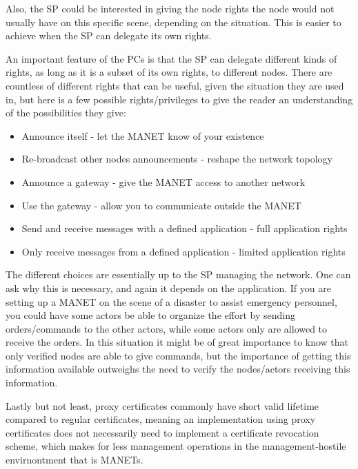 Also, the \ac{SP} could be interested in giving the node rights the node would
not usually have on this specific scene, depending on the situation. This is
easier to achieve when the \ac{SP} can delegate its own rights.

An important feature of the \acp{PC} is that the \ac{SP} can delegate different
kinds of rights, as long as it is a subset of its own rights, to different
nodes. There are countless of different rights that can be useful, given the situation
they are used in, but here is a few possible rights/privileges to give the
reader an understanding of the possibilities they give:

\begin{itemize}
  \item Announce itself - let the \ac{MANET} know of your existence
  \item Re-broadcast other nodes announcements - reshape the network topology
  \item Announce a gateway - give the \ac{MANET} access to another network
  \item Use the gateway - allow you to communicate outside the \ac{MANET}
  \item Send and receive messages with a defined application - full application
  rights
  \item Only receive messages from a defined application - limited application
  rights
\end{itemize}

The different choices are essentially up to the \ac{SP} managing the network.
One can ask why this is necessary, and again it depends on the application. If
you are setting up a \ac{MANET} on the scene of a disaster to assist emergency
personnel, you could have some actors be able to organize the effort by sending
orders/commands to the other actors, while some actors only are allowed to
receive the orders. In this situation it might be of great importance to know
that only verified nodes are able to give commands, but the importance of
getting this information available outweighs the need to verify the nodes/actors
receiving this information.

Lastly but not least, proxy certificates commonly have short valid lifetime
compared to regular certificates, meaning an implementation using proxy
certificates does not necessarily need to implement a certificate revocation
scheme, which makes for less management operations in the management-hostile
envirnontment that is \acp{MANET}.

